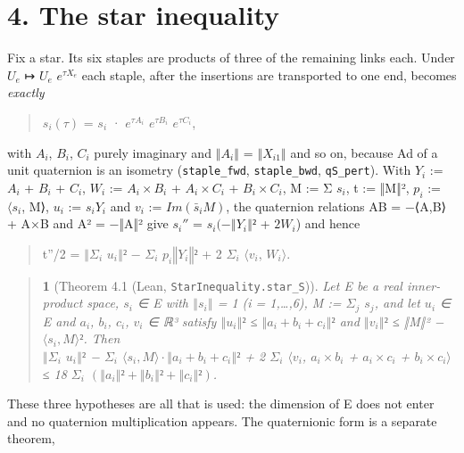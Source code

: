 \documentclass[11pt,a4paper]{article}
\theoremstyle{named}
\newtheorem*{namedthm}{}
\begin{document}
\section*{4. The star inequality}
Fix a star. Its six staples are products of three of the remaining links each. Under $U_e$ ↦ $U_e$ $e^{τX_e}$ each staple, after the insertions are transported to one end, becomes \textit{exactly}

\begin{quote}
$s_i(τ)$ = $s_i$ · $e^{τA_i}$ $e^{τB_i}$ $e^{τC_i}$,
\end{quote}
with $A_i$, $B_i$, $C_i$ purely imaginary and $‖A_i‖$ = $‖X_{i1}‖$ and so on, because Ad of a unit quaternion is an isometry (\texttt{staple\_\allowbreak{}fwd}, \texttt{staple\_\allowbreak{}bwd}, \texttt{qS\_\allowbreak{}pert}). With $Y_i$ := $A_i$ + $B_i$ + $C_i$, $W_i$ := $A_i×B_i$ + $A_i×C_i$ + $B_i×C_i$, M := Σ $s_i$, t := ‖M‖², $p_i$ := $⟨s_i$, M⟩, $u_i$ := $s_iY_i$ and $v_i$ := $Im(\bar{s}_iM)$, the quaternion relations AB = −⟨A,B⟩ + A×B and A² = −‖A‖² give $s_i''$ = $s_i(−‖Y_i‖²$ + $2W_i$) and hence

\begin{quote}
t''/2 = $‖Σ_i$ $u_i‖²$ − $Σ_i$ $p_i‖Y_i‖²$ + 2 $Σ_i$ $⟨v_i$, $W_i⟩$.
\end{quote}
\begin{quote}
\begin{namedthm}[Theorem 4.1 (Lean, \texttt{StarInequality.\allowbreak{}star\_\allowbreak{}S})]
Let E be a real inner-product space, $s_i$ ∈ E with $‖s_i‖$ = 1 (i = 1,…,6), M := $Σ_j$ $s_j$, and let $u_i$ ∈ E and $a_i$, $b_i$, $c_i$, $v_i$ ∈ ℝ³ satisfy $‖u_i‖²$ ≤ $‖a_i+b_i+c_i‖²$ and $‖v_i‖²$ ≤ ‖M‖² − $⟨s_i,M⟩²$. Then\\
$‖Σ_i$ $u_i‖²$ − $Σ_i$ $⟨s_i,M⟩·‖a_i+b_i+c_i‖²$ + 2 $Σ_i$ $⟨v_i$, $a_i×b_i$ + $a_i×c_i$ + $b_i×c_i⟩$ ≤ 18 $Σ_i$ $(‖a_i‖²+‖b_i‖²+‖c_i‖²)$.
\end{namedthm}
\end{quote}
These three hypotheses are all that is used: the dimension of E does not enter and no quaternion multiplication appears. The quaternionic form is a separate theorem,
\end{document}
